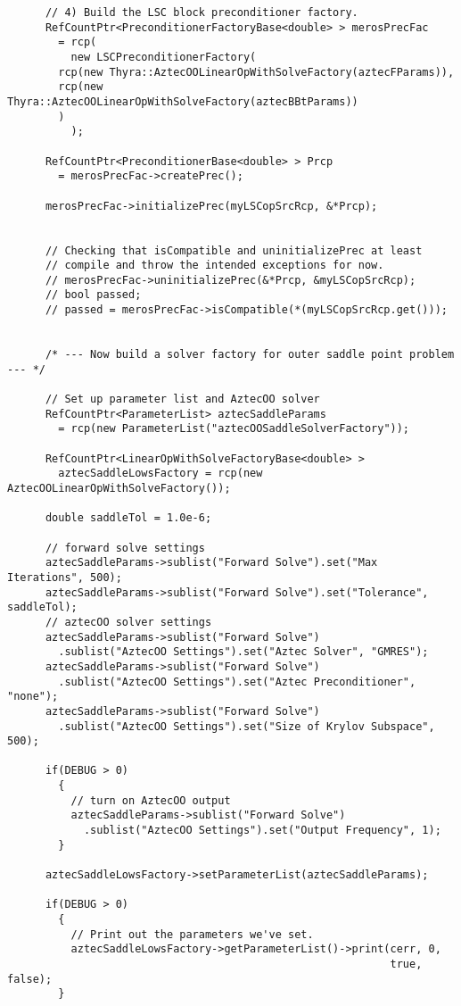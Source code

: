 \documentclass[oneeqnum,onefignum,onetabnum,10pt]{SANDreport}
\begin{document}
\begin{verbatim}
      // 4) Build the LSC block preconditioner factory.
      RefCountPtr<PreconditionerFactoryBase<double> > merosPrecFac
        = rcp(
	      new LSCPreconditionerFactory(
		rcp(new Thyra::AztecOOLinearOpWithSolveFactory(aztecFParams)),
		rcp(new Thyra::AztecOOLinearOpWithSolveFactory(aztecBBtParams))
		)
	      );
      
      RefCountPtr<PreconditionerBase<double> > Prcp 
        = merosPrecFac->createPrec();
      
      merosPrecFac->initializePrec(myLSCopSrcRcp, &*Prcp);


      // Checking that isCompatible and uninitializePrec at least
      // compile and throw the intended exceptions for now.
      // merosPrecFac->uninitializePrec(&*Prcp, &myLSCopSrcRcp);
      // bool passed;
      // passed = merosPrecFac->isCompatible(*(myLSCopSrcRcp.get()));


      /* --- Now build a solver factory for outer saddle point problem --- */

      // Set up parameter list and AztecOO solver
      RefCountPtr<ParameterList> aztecSaddleParams 
        = rcp(new ParameterList("aztecOOSaddleSolverFactory"));
      
      RefCountPtr<LinearOpWithSolveFactoryBase<double> >
        aztecSaddleLowsFactory = rcp(new AztecOOLinearOpWithSolveFactory());
      
      double saddleTol = 1.0e-6;

      // forward solve settings
      aztecSaddleParams->sublist("Forward Solve").set("Max Iterations", 500);
      aztecSaddleParams->sublist("Forward Solve").set("Tolerance", saddleTol);
      // aztecOO solver settings
      aztecSaddleParams->sublist("Forward Solve")
        .sublist("AztecOO Settings").set("Aztec Solver", "GMRES");
      aztecSaddleParams->sublist("Forward Solve")
        .sublist("AztecOO Settings").set("Aztec Preconditioner", "none");
      aztecSaddleParams->sublist("Forward Solve")
        .sublist("AztecOO Settings").set("Size of Krylov Subspace", 500);

      if(DEBUG > 0)
        {
          // turn on AztecOO output
          aztecSaddleParams->sublist("Forward Solve")
            .sublist("AztecOO Settings").set("Output Frequency", 1);
        }

      aztecSaddleLowsFactory->setParameterList(aztecSaddleParams);

      if(DEBUG > 0)
        {
          // Print out the parameters we've set.
          aztecSaddleLowsFactory->getParameterList()->print(cerr, 0, 
                                                            true, false);
        }




\end{verbatim}
\end{document}
